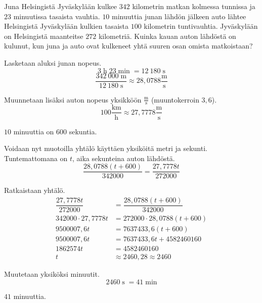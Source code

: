\begin{esimerkki}
	Juna Helsingistä Jyväskylään kulkee $342$ kilometrin matkan kolmessa tunnissa ja $23$ minuutissa tasaista vauhtia.
	$10$ minuuttia junan lähdön jälkeen auto lähtee Helsingistä Jyväskylään kulkien tasaista $100$ kilometrin tuntivauhtia.
	Jyväskylään on Helsingistä maanteitse $272$ kilometriä.
	Kuinka kauan auton lähdöstä on kulunut, kun juna ja auto ovat kulkeneet yhtä suuren osan omista matkoistaan?
	\begin{esimratk}
		Lasketaan aluksi junan nopeus.
		\[ 3 \; \text{h} \; 23 \; \text{min} \; = 12~180 \; \text{s} \]
		\[ \dfrac{342~000 \; \text{m}}{12~180 \; \text{s}} \approx  28,0788 \frac{\text{m}}{\text{s}} \]
		
		Muunnetaan lisäksi auton nopeus yksikköön $\frac{\text{m}}{\text{s}}$ (muuntokerroin $3,6$).
		\[ 100 \frac{\text{km}}{\text{h}} \approx 27,7778 \frac{\text{m}}{\text{s}} \]
		
		$10$ minuuttia on $600$ sekuntia.
		
		Voidaan nyt muotoilla yhtälö käyttäen yksiköitä metri ja sekunti. Tuntemattomana on $t$, aika sekunteina auton lähdöstä.
		\[ \dfrac{28,0788(t+600)}{342000} = \dfrac{27,7778t}{272000} \]
		
		Ratkaistaan yhtälö.
		\begin{align*}
			\dfrac{27,7778t}{272000} &= \dfrac{28,0788(t+600)}{342000}  \\
			342000 \cdot 27,7778t &= 272000 \cdot 28,0788(t+600) \\
			9500007,6t &= 7637433,6(t+600) \\
			9500007,6t &= 7637433,6t + 4582460160 \\
			1862574t &= 4582460160 \\
			t &\approx 2460,28 \approx 2460
		\end{align*}
		
		Muutetaan yksiköksi minuutit.
		\[ 2460 \; \text{s} \; = 41 \; \text{min} \]
	\end{esimratk}
	\begin{esimvast}
		$41$ minuuttia.
	\end{esimvast}
\end{esimerkki}


